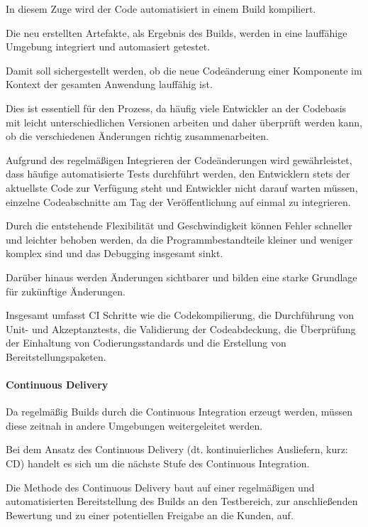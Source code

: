 In diesem Zuge wird der Code automatisiert in einem Build kompiliert. 

Die neu erstellten Artefakte, als Ergebnis des Builds, werden in eine lauffähige Umgebung integriert und automasiert getestet. 

Damit soll sichergestellt werden, ob die neue Codeänderung einer Komponente im Kontext der gesamten Anwendung lauffähig ist. 

Dies ist essentiell für den Prozess, da häufig viele Entwickler an der Codebasis mit leicht unterschiedlichen Versionen arbeiten und daher überprüft werden kann, ob die verschiedenen Änderungen richtig zusammenarbeiten. \cite[S. 69]{verona_practical_2016} 

Aufgrund des regelmäßigen Integrieren der Codeänderungen wird gewährleistet, dass häufige automatisierte Tests durchführt werden, den Entwicklern stets der aktuellste Code zur Verfügung steht und Entwickler nicht darauf warten müssen, einzelne Codeabschnitte am Tag der Veröffentlichung auf einmal zu integrieren. \cite{thedev_eight_2019} 

Durch die entstehende Flexibilität und Geschwindigkeit können Fehler schneller und leichter behoben werden, da die Programmbestandteile kleiner und weniger komplex sind und das Debugging insgesamt sinkt. \cite{thedev_eight_2019}

Darüber hinaus werden Änderungen sichtbarer und bilden eine starke Grundlage für zukünftige Änderungen. 

Insgesamt umfasst CI Schritte wie die Codekompilierung, die Durchführung von Unit- und Akzeptanztests, die Validierung der Codeabdeckung, die Überprüfung der Einhaltung von Codierungsstandards und die Erstellung von Bereitstellungspaketen. \cite{fitzgerald_continuous_2014} 

\paragraph{Continuous Delivery}

Da regelmäßig Builds durch die Continuous Integration erzeugt werden, müssen diese zeitnah in andere Umgebungen weitergeleitet werden. \cite[S. 16 - 18]{sharma_devops_2017}  

Bei dem Ansatz des Continuous Delivery (dt. kontinuierliches Ausliefern, kurz: CD) handelt es sich um die nächste Stufe des Continuous Integration. 

Die Methode des Continuous Delivery baut auf einer regelmäßigen und automatisierten Bereitstellung des Builds an den Testbereich, zur anschließenden Bewertung und zu einer potentiellen Freigabe an die Kunden, auf. \cite[S. 16 - 18]{sharma_devops_2017}  

